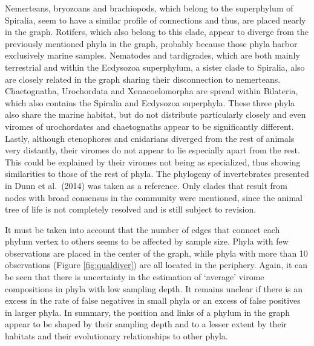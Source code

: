 \documentclass[
  openany]{book}
\begin{document}
Nemerteans, bryozoans and brachiopods, which belong to the superphylum of Spiralia, seem to have a similar profile of connections and thus, are placed nearly in the graph. Rotifers, which also belong to this clade, appear to diverge from the previously mentioned phyla in the graph, probably because those phyla harbor exclusively marine samples. Nematodes and tardigrades, which are both mainly terrestrial and within the Ecdysozoa superphylum, a sister clade to Spiralia, also are closely related in the graph sharing their disconnection to nemerteans. Chaetognatha, Urochordata and Xenacoelomorpha are spread within Bilateria, which also contains the Spiralia and Ecdysozoa superphyla. These three phyla also share the marine habitat, but do not distribute particularly closely and even viromes of urochordates and chaetognaths appear to be significantly different. Lastly, although ctenophores and cnidarians diverged from the rest of animals very distantly, their viromes do not appear to lie especially apart from the rest. This could be explained by their viromes not being as specialized, thus showing similarities to those of the rest of phyla. The phylogeny of invertebrates presented in Dunn et al.~(2014) \autocite{Dunn2014} was taken as a reference. Only clades that result from nodes with broad consensus in the community were mentioned, since the animal tree of life is not completely resolved and is still subject to revision.

It must be taken into account that the number of edges that connect each phylum vertex to others seems to be affected by sample size. Phyla with few observations are placed in the center of the graph, while phyla with more than 10 observations (Figure \ref{fig:qualdiver}) are all located in the periphery. Again, it can be seen that there is uncertainty in the estimation of `average' virome compositions in phyla with low sampling depth. It remains unclear if there is an excess in the rate of false negatives in small phyla or an excess of false positives in larger phyla. In summary, the position and links of a phylum in the graph appear to be shaped by their sampling depth and to a lesser extent by their habitats and their evolutionary relationships to other phyla.
\end{document}
